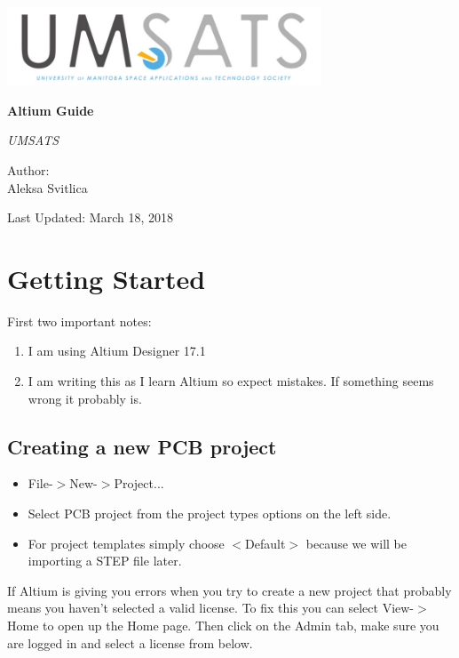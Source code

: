 \documentclass{report}
\begin{document}
	\begin{titlepage}
		\centering
		\includegraphics[width=0.7\textwidth]{"pics/logo"}\par\vspace{1cm}

		\vspace{1cm}

		\vspace{1.5cm}
		{\huge\bfseries Altium Guide\par}
		\vspace{2cm}
		{\Large\itshape UMSATS\par}
		\vfill

		Author:\\ Aleksa Svitlica
		\par		
		\vfill
		
		{\large Last Updated: March 18, 2018\par}
	\end{titlepage}
	\tableofcontents
	\listoffigures
	\newpage
	\chapter{Getting Started}
	First two important notes:
	\begin{enumerate}
		\item I am using Altium Designer 17.1
		\item I am writing this as I learn Altium so expect mistakes. If something seems wrong it probably is.
	\end{enumerate}

	\section{Creating a new PCB project}
	\begin{itemize}
		\item File-$>$New-$>$Project...
		\item Select PCB project from the project types options on the left side.
		\item For project templates simply choose $<$Default$>$ because we will be importing a STEP file later.
	\end{itemize}
	If Altium is giving you errors when you try to create a new project that probably means you haven't selected a valid license. To fix this you can select View-$>$Home to open up the Home page. Then click on the Admin tab, make sure you are logged in and select a license from below.
\end{document}
